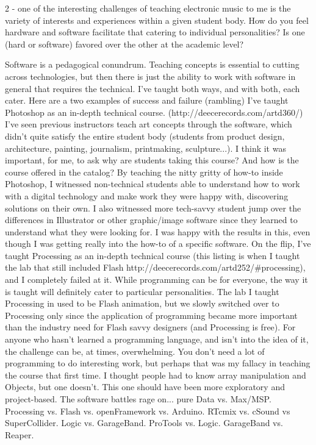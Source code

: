 2 - one of the interesting challenges of teaching electronic music to me is the variety of interests and experiences within a given student body. How do you feel hardware and software facilitate that catering to individual personalities? Is one (hard or software) favored over the other at the academic level? 

Software is a pedagogical conundrum. Teaching concepts is essential to cutting across technologies, but then there is just the ability to work with software in general that requires the technical.  I've taught both ways, and with both, each cater.
Here are a two examples of success and failure (rambling)
 I've taught Photoshop as an in-depth technical course. (http://deecerecords.com/artd360/) I've seen previous instructors teach art concepts through the software, which didn't quite satisfy the entire student body (students from product design, architecture, painting, journalism, printmaking, sculpture...). I think it was important, for me, to ask why are students taking this course? And how is the course offered in the catalog?  By teaching the nitty gritty of how-to inside Photoshop, I witnessed non-technical students able to understand how to work with a digital technology and make work they were happy with, discovering solutions on their own. I also witnessed more tech-savvy student jump over the differences in Illustrator or other graphic/image software since they learned to understand what they were looking for. I was happy with the results in this, even though I was getting really into the how-to of a specific software.
	On the flip, I've taught Processing as an in-depth technical course (this listing is when I taught the lab that still included Flash http://deecerecords.com/artd252/#processing), and I completely failed at it. While programming can be for everyone, the way it is taught will definitely cater to particular personalities. The lab I taught Processing in used to be Flash animation, but we slowly switched over to Processing only since the application of programming became more important than the industry need for Flash savvy designers (and Processing is free). For anyone who hasn't learned a programming language, and isn't into the idea of it, the challenge can be, at times, overwhelming. You don't need a lot of programming to do interesting work, but perhaps that was my fallacy in teaching the course that first time.  I thought people had to know array manipulation and Objects, but one doesn't.  This one should have been more exploratory and project-based.
	The software battles rage on...
	pure Data vs. Max/MSP.  
	Processing vs. Flash vs. openFramework vs. Arduino.  
	RTcmix vs. cSound vs SuperCollider.
	Logic vs. GarageBand.  ProTools vs. Logic.  GarageBand vs. Reaper.
	
